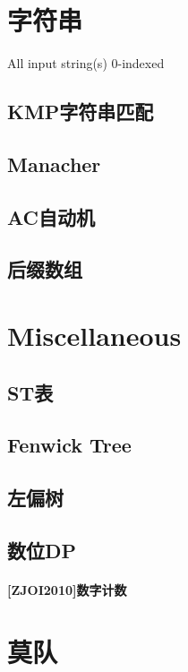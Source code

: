 \documentclass{article}
\begin{document}
	\section{字符串}
		All input string(s) 0-indexed
		\subsection{KMP字符串匹配}
		
		\subsection{Manacher}
		
		\subsection{AC自动机}
		
		\subsection{后缀数组}
		

	\newpage

	\section{Miscellaneous}
		\subsection{ST表}
		
		\subsection{Fenwick Tree}
		
		\subsection{左偏树}
		
		\subsection{数位DP}
		\paragraph{[ZJOI2010]数字计数}
		
	\newpage

	\section{莫队}
\end{document}
